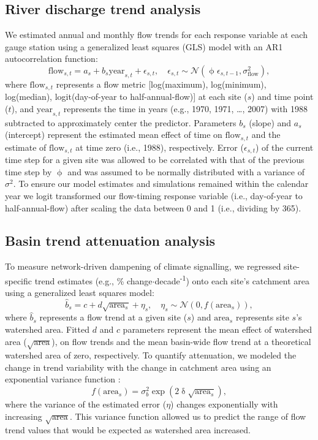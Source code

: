 \documentclass[9pt,twocolumn,twoside,lineno]{pnas-new}
\begin{document}
{\subsection*{River discharge trend analysis} We estimated annual and monthly flow trends for each response variable at each gauge station using a generalized least squares (GLS) model with an AR1 autocorrelation function:
\begin{equation}
  \mathrm{flow}_{s,t} = a_s + b_s \mathrm{year}_{s,t} + \epsilon_{s,t}, \quad 
  \epsilon_{s,t} \sim \mathcal{N}(\upphi \epsilon_{s,t-1}, \sigma_\mathrm{flow}^2) \label{eq1},
\end{equation}
where $\mathrm{flow}_{s,t}$ represents a flow metric [log(maximum), log(minimum), log(median), logit(day-of-year to half-annual-flow)] at each site ($s$) and time point ($t$),  and $\mathrm{year}_{s,t}$ represents the time in years (e.g., 1970, 1971, \ldots, 2007) with 1988 subtracted to approximately center the predictor. Parameters $b_{s}$ (slope) and $a_{s}$ (intercept) represent the estimated mean effect of time on $\mathrm{flow}_{s,t}$ and the estimate of $\mathrm{flow}_{s,t}$ at time zero (i.e., 1988), respectively. Error ($\epsilon_{s,t}$) of the current time step for a given site was allowed to be correlated with that of the previous time step by $\upphi$ and was assumed to be normally distributed with a variance of $\sigma^{2}$. To ensure our model estimates and simulations remained within the calendar year we logit transformed our flow-timing response variable (i.e., day-of-year to half-annual-flow) after scaling the data between 0 and 1 (i.e., dividing by 365).

\subsection*{Basin trend attenuation analysis} To measure network-driven dampening of climate signalling, we regressed site-specific trend estimates (e.g., \% change$\cdot$decade\textsuperscript{-1}) onto each site's catchment area using a generalized least squares model:
\begin{equation}
	\hat{b}_{s} = c + d\sqrt{\mathrm{area}_{s}} + \eta_{s}, \quad
  \eta_{s} \sim \mathcal{N}(0, f(\mathrm{area}_{s})) \label{eq2},
\end{equation}
where $\hat{b}_{s}$ represents a flow trend at a given site ($s$) and $\mathrm{area}_{s}$ represents site $s$'s watershed area. Fitted $d$ and $c$ parameters represent the mean effect of watershed area ($\sqrt{\mathrm{area}}$), on flow trends and the mean basin-wide flow trend at a theoretical watershed area of zero, respectively. To quantify attenuation, we modeled the change in trend variability with the change in catchment area using an exponential variance function \cite[p.~211]{Pinheiro:2000}: 
\begin{equation}
	f(\mathrm{area}_{s}) = \sigma_b^2 \exp(2\updelta\sqrt{\mathrm{area}_{s}}) \label{eq3},
\end{equation}
where the variance of the estimated error ($\eta$) changes exponentially with increasing $\sqrt{\mathrm{area}}$. This variance function allowed us to predict the range of flow trend values that would be expected as watershed area increased. 

}
\end{document}
